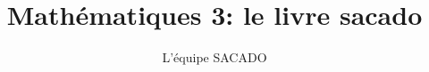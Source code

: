 





\title{Mathématiques 3\ieme : le livre sacado}
\author{L'équipe SACADO}

\setlength\parindent{0pt}




\maketitle

 
%
%
%
%
%
%
%
%
%  
%
%

